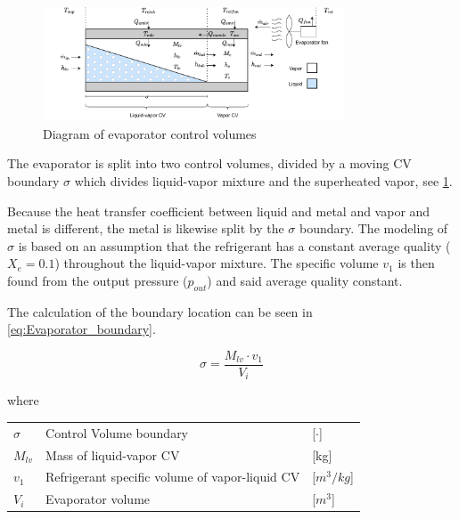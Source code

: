 \clearpage

\begin{figure}[h!]
	\centering
	\includegraphics[width=0.8\textwidth]{Graphics/Evaporator_CV_diagram.pdf}
	\caption{Diagram of evaporator control volumes}
	\label{fig:evap_CV}
\end{figure}

The evaporator is split into two control volumes, divided by a moving CV boundary $\sigma$ which divides liquid-vapor mixture and the superheated vapor, see \cref{fig:evap_CV}.

Because the heat transfer coefficient between liquid and metal and vapor and metal is different, the metal is likewise split by the $\sigma$ boundary. The modeling of $\sigma$ is based on an assumption that the refrigerant has a constant average quality ($X_e = 0.1$) throughout the liquid-vapor mixture. The specific volume $v_1$ is then found from the output pressure ($p_{out}$) and said average quality constant.

The calculation of the boundary location can be seen in \cref{eq:Evaporator_boundary}.

\begin{equation} \label{eq:Evaporator_boundary}
	\sigma = \frac{M_{lv} \cdot v_1}{V_i}
\end{equation}

where

\begin{center}
	\begin{tabular}{l p{8cm} l}
		$\sigma$ & Control Volume boundary                        & [$\cdot$]            \\
		$M_{lv}$    & Mass of liquid-vapor CV                        & [\si{kg}]            \\
		$v_1$    & Refrigerant specific volume of vapor-liquid CV & [$\si{m}^3/\si{kg}$] \\
		$V_i$    & Evaporator volume                              & [$\si{m}^3$]
	\end{tabular}
\end{center}

